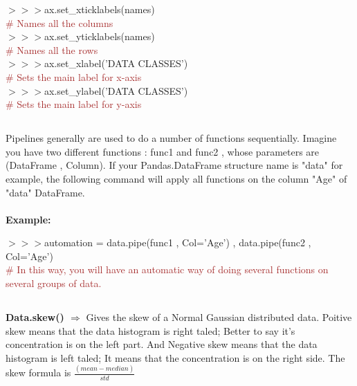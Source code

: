 \documentclass[a4paper,18pt]{article}
\begin{document}
$>>>$ax.set\_xticklabels(names)\\{\textcolor{brown}{\# Names all the columns}}\\

$>>>$ax.set\_yticklabels(names)\\{\textcolor{brown}{\# Names all the rows}}\\

$>>>$ax.set\_xlabel('DATA CLASSES')\\{\textcolor{brown}{\# Sets the main label for x-axis}}\\

$>>>$ax.set\_ylabel('DATA CLASSES')\\{\textcolor{brown}{\# Sets the main label for y-axis}}\\


\subsection{\colorbox {matgreen}{\color{white}{\large Pipeline in pandas}}}
Pipelines generally are used to do a number of functions sequentially. Imagine you have two different functions : func1 and func2 , whose parameters are (DataFrame , Column). If your Pandas.DataFrame structure name is "data" for example, the following command will apply all functions on the column "Age" of "data" DataFrame. \\\\
\textbf{Example:\\}

$>>>$automation = data.pipe(func1 , Col='Age') , data.pipe(func2 , Col='Age')\\

{\textcolor{brown}{\# In this way, you will have an automatic way of doing several functions on several groups of data.}}\\



\subsection{\colorbox {matgreen}{\color{white}{\large Data.skew()}}}
\textbf{Data.skew() $\Rightarrow$} Gives the skew of a Normal Gaussian distributed data. Poitive skew means that the data histogram is right taled; Better to say it's concentration is on the left part. And Negative skew means that the data histogram is left taled; It means that the concentration is on the right side. The skew formula is $\frac{(mean-median)}{std}$\\\\
\end{document}
